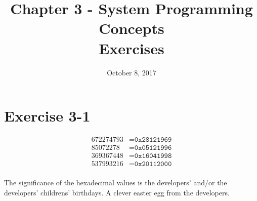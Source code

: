 \documentclass{article}
\title{Chapter 3 - System Programming Concepts \\
Exercises}
\date{October 8, 2017}
\begin{document}
\maketitle
{}
\section{Exercise 3-1}

\begin{align*}
   672274793 &= \texttt{0x28121969}\\
    85072278 &= \texttt{0x05121996}\\
   369367448 &= \texttt{0x16041998}\\
   537993216 &= \texttt{0x20112000}\\
\end{align*}

The significance of the hexadecimal values is the developers' and/or the developers' childrens' birthdays. A clever easter egg from the developers.
\end{document}

